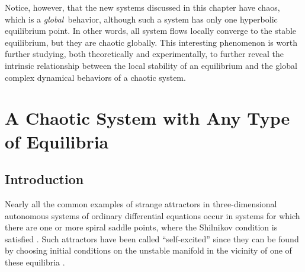 Notice, however, that the new systems discussed in this chapter have chaos,
which is a \emph{global\,} behavior, although such a system
has only one hyperbolic equilibrium point. In other words, all system flows
locally converge
to the stable equilibrium, but they are chaotic globally. This interesting
phenomenon is
worth further studying, both theoretically and experimentally, to further reveal
the intrinsic relationship between the local stability of an equilibrium and the
global complex dynamical behaviors of a chaotic system.


\section{A Chaotic System with Any Type of Equilibria}


\subsection{Introduction}
Nearly all the common examples of strange attractors in three-dimensional autonomous
systems of ordinary differential equations occur in systems for which there
are one or more spiral saddle points, where the Shilnikov condition is satisfied \cite{01Shilnikov1998Methods}. Such
attractors have been called “self-excited” since they can be found by choosing initial
conditions on the unstable manifold in the vicinity of one of these equilibria \cite{02Leonov2011Localization,03Leonov2012IWCFTA2012}.

